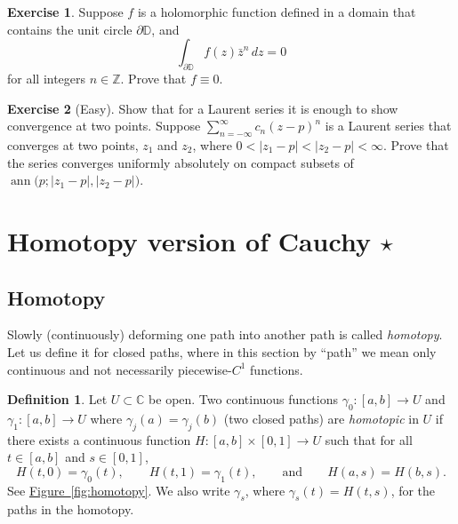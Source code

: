 \documentclass[12pt,openany]{book}
\newcommand{\ann}{\operatorname{ann}}
\newcommand{\sabs}[1]{\lvert {#1} \rvert}
\newcommand{\C}{{\mathbb{C}}}
\newcommand{\Z}{{\mathbb{Z}}}
\newcommand{\D}{{\mathbb{D}}}
\newcommand{\myindex}[1]{#1\index{#1}}
\newcommand{\myquote}[1]{``#1''}
\theoremstyle{plain}
\theoremstyle{remark}
\theoremstyle{definition}
\newtheorem{defn}[thm]{Definition}
\newenvironment{exbox}{%
    \def\FrameCommand{\vrule width 1pt \relax\hspace{10pt}}%
    \MakeFramed{\advance\hsize-\width\FrameRestore}%
}{%
    \endMakeFramed
}
\theoremstyle{exercise}
\newtheorem{exercise}{Exercise}[section]
\theoremstyle{example}
\newcommand{\figureref}[1]{\hyperref[#1]{Figure~\ref*{#1}}}
\begin{document}
\begin{exbox}
\begin{exercise}
Suppose $f$ is a holomorphic function defined in a domain that contains
the unit circle $\partial \D$, and
\begin{equation*}
\int_{\partial \D} f(z)\bar{z}^n
 \, dz = 0
\end{equation*}
for all integers $n \in \Z$.  Prove that $f \equiv 0$.
\end{exercise}

\begin{exercise}[Easy]
Show that for a Laurent series it is enough to show convergence
at two points.  Suppose $\sum_{n=-\infty}^\infty c_n {(z-p)}^n$ is a Laurent
series that converges at two points, $z_1$ and $z_2$, where
$0 < \sabs{z_1-p} < \sabs{z_2-p} < \infty$.
Prove that the series converges uniformly absolutely on compact subsets
of $\ann\bigl(p;\sabs{z_1-p},\sabs{z_2-p}\bigr)$.
\end{exercise}
\end{exbox}


\section{Homotopy version of Cauchy \texorpdfstring{$\star$}{*}}

\subsection{Homotopy}

Slowly (continuously) deforming one path into another path
is called \emph{\myindex{homotopy}}.  Let us
define it for closed paths,
where in this section by \myquote{path} we mean only
continuous and not necessarily piecewise-$C^1$ functions.

\begin{defn}\label{defn:homotopy}
Let $U \subset \C$ be open.
Two continuous functions
$\gamma_0 \colon [a,b] \to U$ and
$\gamma_1 \colon [a,b] \to U$
where $\gamma_j(a)=\gamma_j(b)$ (two closed paths)
are \emph{\myindex{homotopic}} in $U$
if there exists a continuous function
$H \colon [a,b] \times [0,1] \to U$ such that
for all $t \in [a,b]$ and $s \in [0,1]$,
\begin{equation*}
H(t,0) = \gamma_0(t), \qquad
H(t,1) = \gamma_1(t), \qquad \text{and} \qquad
H(a,s) = H(b,s) .
\end{equation*}
See \figureref{fig:homotopy}.
We also write $\gamma_s$, where $\gamma_s(t) = H(t,s)$, for the paths in the homotopy.
\end{defn}
\end{document}
